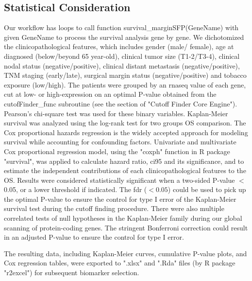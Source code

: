 \documentclass[cancers,article,submit,moreauthors,pdftex]{Definitions/mdpi}
\begin{document}
\begin{paracol}{2}
\subsection*{Statistical Consideration}

Our workflow has loops to call function survival\_marginSFP(GeneName) with given GeneName to process the survival analysis gene by gene.
We dichotomized the clinicopathological features, which includes gender (male/ female), age at diagnosed (below/beyond 65 year-old), clinical tumor size (T1-2/T3-4), clinical nodal status (negative/positive), clinical distant metastasis (negative/positive), TNM staging (early/late), surgical margin status (negative/positive) and tobacco exposure (low/high). The patients were grouped by an \acrshort{rnaseq} value of each gene, cut at low- or high-expression on an optimal P-value obtained from the cutofFinder\_func subroutine (see the section of "Cutoff Finder Core Engine"). Pearson's chi-square test was used for these binary variables. Kaplan-Meier survival was analyzed using the log-rank test for two groups OS comparison.
The Cox proportional hazards regression is the widely accepted approach for modeling survival while accounting for confounding factors\cite{Magen2019}. Univariate and multivariate Cox proportional regression model\cite{Andersen1982}, using the "coxph" function in R package "survival", was applied to calculate hazard ratio, \acrfull{ci95} and its significance, and to estimate the independent contributions of each clinicopathological features to the OS.
Results were considered statistically significant when a two-sided P-value $<$ 0.05, or a lower threshold if indicated.
The \acrfull{fdr} ($< 0.05$) could be used to pick up the optimal P-value to ensure the control for type I error of the Kaplan-Meier survival test during the cutoff finding procedure.
There were also multiple correlated tests of null hypotheses in the Kaplan-Meier family during our global scanning of protein-coding genes. The stringent Bonferroni correction could result in an adjusted P-value to ensure the control for type I error. 

The resulting data, including Kaplan-Meier curves, cumulative P-value plots, and Cox regression tables, were exported to ".xlsx" and ".Rda" files (by R package "r2excel") for subsequent biomarker selection.


\end{paracol}
\end{document}
